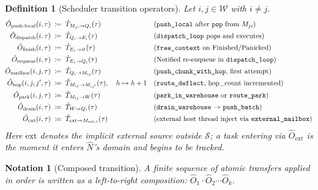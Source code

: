 \documentclass[11pt,a4paper]{article}
\newtheorem{definition}{Definition}[section]
\newtheorem{notation}{Notation}[section]
\newcommand{\Num}{\hat{N}}
\newcommand{\Trf}[2]{\hat{T}_{#1 \to #2}}
\newcommand{\code}[1]{\texttt{#1}}
\begin{document}
\begin{definition}[Scheduler transition operators]
\label{def:ops}
Let $i, j \in \mathcal{W}$ with $i \neq j$.
\begin{align}
  \hat{O}_{\text{push-local}}(i, \tau) &\;\coloneqq\;
    \Trf{M_{ji}}{Q_i}(\tau)
    &&\text{(\code{push\_local} after \code{pop} from } M_{ji}\text{)}
    \label{eq:push-local}\\
  \hat{O}_{\text{dispatch}}(i, \tau) &\;\coloneqq\;
    \Trf{Q_i}{E_i}(\tau)
    &&\text{(\code{dispatch\_loop} pops and executes)}
    \label{eq:dispatch}\\
  \hat{O}_{\text{finish}}(i, \tau) &\;\coloneqq\;
    \Trf{E_i}{\varnothing}(\tau)
    &&\text{(\code{free\_context} on Finished/Panicked)}
    \label{eq:finish}\\
  \hat{O}_{\text{requeue}}(i, \tau) &\;\coloneqq\;
    \Trf{E_i}{Q_i}(\tau)
    &&\text{(Notified re-enqueue in \code{dispatch\_loop})}
    \label{eq:requeue}\\
  \hat{O}_{\text{mailbox}}(i,j,\tau) &\;\coloneqq\;
    \Trf{Q_i}{M_{ij}}(\tau)
    &&\text{(\code{push\_chunk\_with\_hop}, first attempt)}
    \label{eq:mailbox}\\
  \hat{O}_{\text{hop}}(i,j,j',\tau) &\;\coloneqq\;
    \Trf{M_{ij}}{M_{ij'}}(\tau),\quad h \mapsto h+1
    &&\text{(\code{route\_deflect}, hop\_count incremented)}
    \label{eq:hop}\\
  \hat{O}_{\text{park}}(i,j,\tau) &\;\coloneqq\;
    \Trf{M_{ij}}{W}(\tau)
    &&\text{(\code{park\_in\_warehouse} or \code{route\_park})}
    \label{eq:park}\\
  \hat{O}_{\text{drain}}(i,\tau) &\;\coloneqq\;
    \Trf{W}{Q_i}(\tau)
    &&\text{(\code{drain\_warehouse} \(\to\) \code{push\_batch})}
    \label{eq:drain}\\
  \hat{O}_{\text{ext}}(i,\tau) &\;\coloneqq\;
    \Trf{\text{ext}}{M_{\text{ext},i}}(\tau)
    &&\text{(external host thread inject via \code{external\_mailbox})}
    \label{eq:ext}
\end{align}
Here \(\text{ext}\) denotes the implicit external source outside
$\mathcal{S}$; a task entering via $\hat{O}_{\text{ext}}$ is the
moment it \emph{enters} $\Num$'s domain and begins to be tracked.
\end{definition}

\begin{notation}[Composed transition]
A finite sequence of atomic transfers applied in order is written as
a left-to-right composition:
$\hat{O}_1 \cdot \hat{O}_2 \cdots \hat{O}_k$.
\end{notation}
\end{document}
